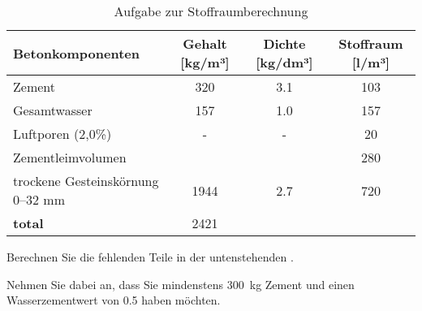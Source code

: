 \begin{questions}
\begin{solution}
\begin{table}[H]
            \caption{Aufgabe zur Stoffraumberechnung}
            \begin{tabularx}{\textwidth}{Xccc}
            \toprule
            \textbf{Betonkomponenten}       & \textbf{Gehalt [kg/m³]} & \textbf{Dichte [kg/dm³]} & \textbf{Stoffraum [l/m³]} \\ 
            \midrule
            Zement                           & 320                      & 3.1                       &    103          \\
            Gesamtwasser                     & 157                      & 1.0                       & 157            \\
            Luftporen (2,0\%)                & -                        & -                         & 20              \\
            Zementleimvolumen                &                          &                           &  280                         \\
            trockene Gesteinskörnung 0–32 mm & 1944                    & 2.7                       & 720            \\
            \textbf{total}                   & 2421           &            {}               & {}             \\
            \bottomrule
        \end{tabularx}
        \label{tab:Stoffraumberechnung1sol}
            \end{table}
        
    \end{solution}




        \question Berechnen Sie die fehlenden Teile in der untenstehenden .

        Nehmen Sie dabei an, dass Sie mindenstens \SI{300}{\kg} Zement und einen Wasserzementwert von 0.5 haben möchten.


\end{questions}
